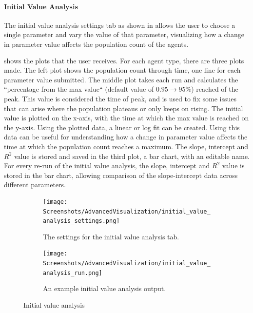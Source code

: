 \paragraph{Initial Value Analysis}
\label{sec:initial_value_analysis}
The initial value analysis settings tab as shown in  allows the user to choose a single parameter and vary the value of that parameter, visualizing how a change in parameter value affects the population count of the agents.

 shows the plots that the user receives.
For each agent type, there are three plots made.
The left plot shows the population count through time, one line for each parameter value submitted.
The middle plot takes each run and calculates the “percentage from the max value“ (default value of $0.95 \rightarrow 95\%$) reached of the peak.
This value is considered the time of peak, and is used to fix some issues that can arise where the population plateaus or only keeps on rising.
The initial value is plotted on the x-axis, with the time at which the max value is reached on the y-axis.
Using the plotted data, a linear or log fit can be created.
Using this data can be useful for understanding how a change in parameter value affects the time at which the population count reaches a maximum.
The slope, intercept and $R^2$ value is stored and saved in the third plot, a bar chart, with an editable name.
For every re-run of the initial value analysis, the slope, intercept and $R^2$ value is stored in the bar chart, allowing comparison of the slope-intercept data across different parameters. 

\begin{figure}[!ht]
    \centering
    \begin{subfigure}{0.49\linewidth}
        \centering
        \vspace*{\fill}
        \texttt{[image: Screenshots/AdvancedVisualization/initial\_value\_analysis\_settings.png]}
        \caption{
            The settings for the initial value analysis tab. 
        }
        \label{fig:ss:av:initial_value_analysis_settings}
        \vspace*{\fill}
    \end{subfigure}
    \hfill
    \begin{subfigure}{0.49\linewidth}
        \centering
        \vspace*{\fill}
        \texttt{[image: Screenshots/AdvancedVisualization/initial\_value\_analysis\_run.png]}
        \caption{
            An example initial value analysis output. 
        }
        \label{fig:ss:av:initial_value_analysis_run}
        \vspace*{\fill}
    \end{subfigure}
    \caption{Initial value analysis}
\end{figure}

